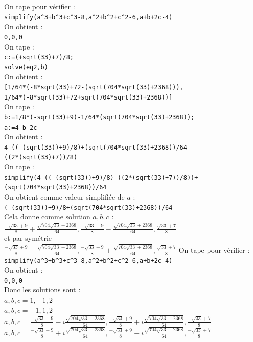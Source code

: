 \documentclass[a4paper,11pt]{book}
\begin{document}
On tape pour v\'erifier :\\
{\tt simplify(a\verb|^|3+b\verb|^|3+c\verb|^|3-8,a\verb|^|2+b\verb|^|2+c\verb|^|2-6,a+b+2c-4)}\\
On obtient :\\
{\tt 0,0,0}\\
On tape :\\
{\tt c:=(+sqrt(33)+7)/8;}\\
{\tt solve(eq2,b)}\\
On obtient :\\
{\tt [1/64*(-8*sqrt(33)+72-(sqrt(704*sqrt(33)+2368))),\\ 1/64*(-8*sqrt(33)+72+sqrt(704*sqrt(33)+2368))]}\\
On tape :\\
{\tt b:=1/8*(-sqrt(33)+9)-1/64*(sqrt(704*sqrt(33)+2368));}\\
{\tt a:=4-b-2c}\\
On obtient :\\
{\tt 4-((-(sqrt(33))+9)/8)+(sqrt(704*sqrt(33)+2368))/64-\\((2*(sqrt(33)+7))/8)}\\
On tape :\\
{\tt simplify(4-((-(sqrt(33))+9)/8)-((2*(sqrt(33)+7))/8))+\\
(sqrt(704*sqrt(33)+2368))/64}\\
On obtient comme valeur simplifi\'ee de $a$ :\\
{\tt (-(sqrt(33))+9)/8+(sqrt(704*sqrt(33)+2368))/64}\\
Cela donne comme solution $a,b,c$ :\\
$\displaystyle \frac{-\sqrt{33}+9}{8}+\frac{\sqrt{704\sqrt{33}+2368}}{64},\frac{-\sqrt{33}+9}{8}-\frac{\sqrt{704\sqrt{33}+2368}}{64},\frac{\sqrt{33}+7}{8}$\\
 et par sym\'etrie \\
$\displaystyle \frac{-\sqrt{33}+9}{8}-\frac{\sqrt{704\sqrt{33}+2368}}{64}, \frac{-\sqrt{33}+9}{8}+\frac{\sqrt{704\sqrt{33}+2368}}{64},\frac{\sqrt{33}+7}{8}$
On tape  pour v\'erifier :\\
{\tt simplify(a\verb|^|3+b\verb|^|3+c\verb|^|3-8,a\verb|^|2+b\verb|^|2+c\verb|^|2-6,a+b+2c-4)}\\
On obtient :\\
{\tt 0,0,0}\\
Donc les solutions sont :\\
$a,b,c=1,-1,2$\\
$a,b,c=-1,1,2$\\
$\displaystyle  a,b,c=\frac{-\sqrt{33}+9}{8}-i\frac{\sqrt{704\sqrt{33}-2368}}{64},\frac{-\sqrt{33}+9}{8}+i\frac{\sqrt{704\sqrt{33}-2368}}{64},\frac{-\sqrt{33}+7}{8}$\\
$\displaystyle  a,b,c=\frac{-\sqrt{33}+9}{8}+i\frac{\sqrt{704\sqrt{33}-2368}}{64},\frac{-\sqrt{33}+9}{8}-i\frac{\sqrt{704\sqrt{33}-2368}}{64},\frac{-\sqrt{33}+7}{8}$\\
\end{document}
